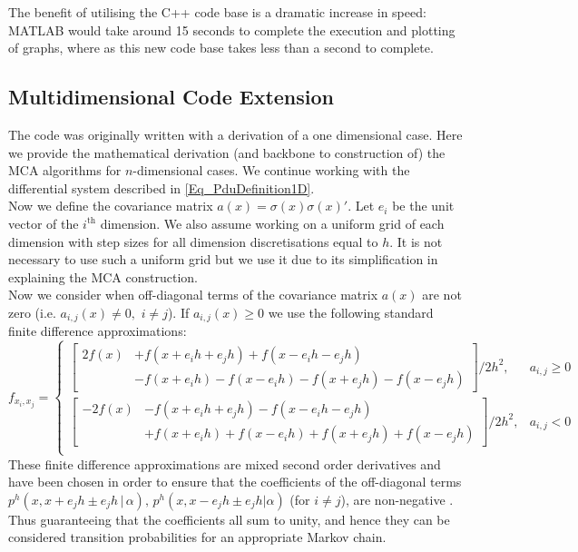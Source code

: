\documentclass[11pt,draftd]{article}
\begin{document}
The benefit of utilising the C++ code base is a dramatic increase in speed: MATLAB would take around 15 seconds to complete the execution and plotting of graphs, where as this new code base takes less than a second to complete.
\subsection{Multidimensional Code Extension} 
The code was originally written with a derivation of a one dimensional case. Here we provide the mathematical derivation (and backbone to construction of) the MCA algorithms for $ n $-dimensional cases. We continue working with the differential system described in \eqref{Eq_PduDefinition1D}. \\ 
 
Now we define the covariance matrix $ a(x) = \sigma(x)\sigma(x)' $. Let $ e_{i} $ be the unit vector of the $ i^{\text{th}} $ dimension. We also assume working on a uniform grid of each dimension with step sizes for all dimension discretisations equal to $ h $. It is not necessary to use such a uniform grid but we use it due to its simplification in explaining the MCA construction. \\ 
 
Now we consider when off-diagonal terms of the covariance matrix $ a(x) $ are not zero (i.e. $ a_{i,j}(x) \ne 0,\,\, i\ne j $). If $ a_{i,j}(x) \ge 0 $ we use the following standard finite difference approximations: 
\begin{equation*} 
f_{x_{i},x_{j}} = 
\begin{cases} 
 \left[\begin{split} 
2f(x) &+ f(x + e_{i}h + e_{j}h) + f(x -  e_{i}h - e_{j}h)  \\  
&- f(x + e_i h ) - f(x - e_i h) - f(x + e_j h) - f(x - e_j h) 
\end{split}\right] \bigg/ 2h^2, & a_{i,j} \ge 0 \\ 
 \left[\begin{split} 
-2f(x) &- f(x + e_{i}h + e_{j}h) - f(x -  e_{i}h - e_{j}h)  \\  
&+ f(x + e_i h ) + f(x - e_i h) + f(x + e_j h) + f(x - e_j h) 
\end{split}\right] \bigg/ 2h^2, & a_{i,j} < 0 \\ 
\end{cases} 
\end{equation*} 
These finite difference approximations are mixed second order derivatives and have been chosen in order to ensure that the coefficients of the off-diagonal terms $ p^{h}(x, x + e_{j}h \pm e_{j}h \,\vert\, \alpha),\, p^{h}(x, x - e_{j}h \pm e_{j}h \vert \alpha)$ (for $ i \ne j $), are non-negative \cite{kushner}. Thus guaranteeing that the coefficients all sum to unity, and hence they can be considered transition probabilities for an appropriate Markov chain. \\ 
 
\end{document}
